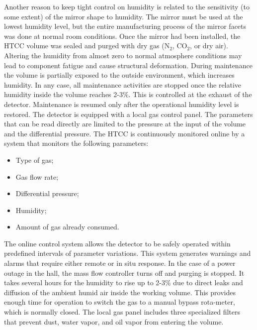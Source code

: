 Another reason to keep tight control on humidity is related to the sensitivity (to some extent) of the mirror shape to humidity. The mirror must be used at the lowest humidity level, but the entire manufacturing process of the mirror facets was done at normal room conditions. Once the mirror had been installed, the HTCC volume was sealed and purged with dry gas (N${_2}$, CO${_2}$, or dry air). Altering the humidity from almost zero to normal atmosphere conditions may lead to component fatigue and cause structural deformation. During maintenance the volume is partially exposed to the outside environment, which increases humidity. In any case, all maintenance activities are stopped once the relative humidity inside the volume reaches 2-3\%. This is controlled at the exhaust of the detector. Maintenance is resumed only after the operational humidity level is restored. The detector is equipped with a local gas control panel. The parameters that can be read directly are limited to the pressure at the input of the volume and the differential pressure. The HTCC is continuously monitored online by a system that monitors the following parameters:

\begin{itemize}
    \item Type of gas;
    \item Gas flow rate;
    \item Differential pressure;
    \item Humidity;
    \item Amount of gas already consumed.
\end{itemize}

The online control system allows the detector to be safely operated within predefined intervals of parameter variations. This system generates warnings and alarms that require either remote or in situ response. In the case of a power outage in the hall, the mass flow controller turns off and purging is stopped. It takes several hours for the humidity to rise up to 2-3\% due to direct leaks and diffusion of the ambient humid air inside the working volume. This provides enough time for operation to switch the gas to a manual bypass rota-meter, which is normally closed. The local gas panel includes three specialized filters that prevent dust, water vapor, and oil vapor from entering the volume.

